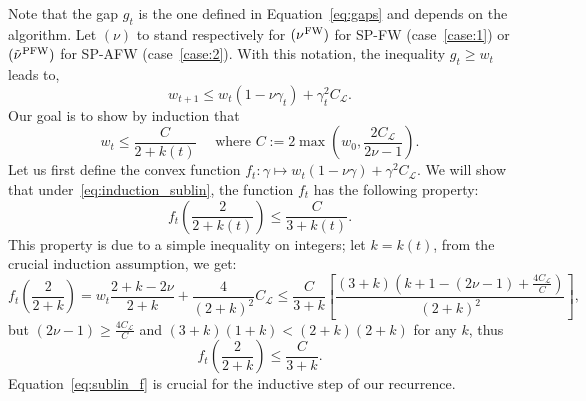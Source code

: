 \documentclass[twoside]{article}
\renewcommand{\L}{\mathcal{L}}
\newcommand{\wt}{w_t}
\newcommand{\wtt}{w_{t+1}}
\newcommand{\gap}{g_{t}}
\newcommand{\CondNumb}{\nu}
\newcommand{\FW}{{\hspace{0.05em}\textnormal{FW}}}
\newcommand{\PW}{{\hspace{0.05em}\textnormal{PFW}}}
\newcommand{\0}{\mathbf{0}} %
\begin{document}
    Note that the gap $\gap$ is the one defined in Equation~\eqref{eq:gaps} and depends on the algorithm.
    Let $(\CondNumb)$ to stand respectively for $(\CondNumb^{\FW})$ for SP-FW (case~\eqref{case:1}) or $(\tilde \CondNumb^{\PW})$ for SP-AFW (case~\eqref{case:2}). With this notation, the inequality $\gap \geq w_t$ leads to,
      \begin{equation}\label{eq:def_f}
          \wtt 
       \leq \wt \left( 1- \CondNumb\gamma_t \right)   
      + \gamma_t^2 {C_\L}. 
      \end{equation}
      Our goal is to show by induction that 
      \begin{equation}\label{eq:induction_sublin}\tag{$\star$}
      w_t \leq \frac{C}{2+k(t)} \quad \text{ where } C := 2\max \left( w_0, \frac{2C_\L}{2 \CondNumb -1} \right).
      \end{equation}
      Let us first define the convex function $f_t :\gamma \mapsto  \wt \left( 1- \CondNumb\gamma \right)
      + \gamma^2 {C_\L}$. 
      We will show that under~\eqref{eq:induction_sublin}, the function $f_t$ has the following property:
      \begin{equation}
        f_t\left(\frac{2}{2+k(t)}\right) \leq \frac{C}{3+k(t)} .
      \end{equation}
      This property is due to a simple inequality on integers; let $k = k(t)$, from the crucial induction assumption, we get:
      \begin{equation}
        f_t\left(\frac{2}{2+k}\right) 
       = 
          w_{t} \frac{2+k - 2 \CondNumb}{2+k}+ \frac{4}{(2+k)^2} {C_\L} 
       \leq 
          \frac{C}{3+k} \left[ \frac{(3+k)(k+1 - (2 \CondNumb - 1) +\frac{4C_\L}{C})}{(2+k)^2} \right], 
      \end{equation}
      but $(2 \CondNumb - 1) \geq \frac{4C_\L}{C}$ and $(3+k)(1+k)<(2+k)(2+k)$ for any $k$, thus 
      \begin{equation}\label{eq:sublin_f}
       f_t\left(\frac{2}{2+k}\right)  \leq \frac{C}{3+k}.
      \end{equation}
      Equation~\eqref{eq:sublin_f} is crucial for the inductive step of our recurrence.
\end{document}
